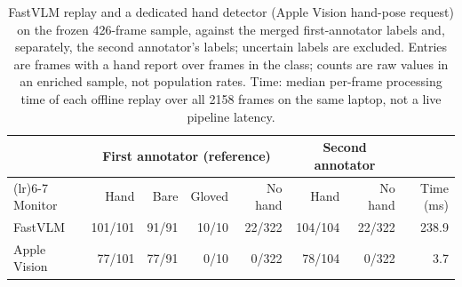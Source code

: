 \begin{table}[H]\centering\small
\caption{FastVLM replay and a dedicated hand detector (Apple Vision hand-pose request) on the frozen 426-frame sample, against the merged first-annotator labels and, separately, the second annotator's labels; uncertain labels are excluded. Entries are frames with a hand report over frames in the class; counts are raw values in an enriched sample, not population rates. Time: median per-frame processing time of each offline replay over all 2158 frames on the same laptop, not a live pipeline latency.}\label{tab:hand-detector}
\begin{tabularx}{\linewidth}{>{\raggedright\arraybackslash}Xrrrrrrr}
\toprule & \multicolumn{4}{c}{First annotator (reference)} & \multicolumn{2}{c}{Second annotator} & \\ \cmidrule(lr){2-5}\cmidrule(lr){6-7}
Monitor & Hand & Bare & Gloved & No hand & Hand & No hand & Time (ms)\\ \midrule
FastVLM & 101/101 & 91/91 & 10/10 & 22/322 & 104/104 & 22/322 & 238.9\\
Apple Vision & 77/101 & 77/91 & 0/10 & 0/322 & 78/104 & 0/322 & 3.7\\
\bottomrule
\end{tabularx}
\end{table}

